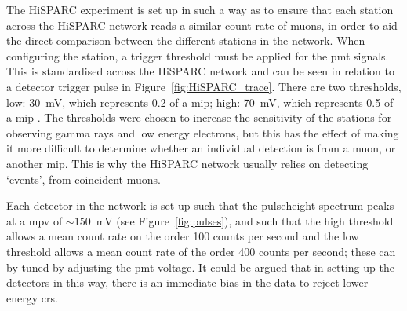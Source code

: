The HiSPARC experiment is set up in such a way as to ensure that each station across the HiSPARC network reads a similar count rate of muons, in order to aid the direct comparison between the different stations in the network. When configuring the station, a trigger threshold must be applied for the \gls{pmt} signals. This is standardised across the HiSPARC network and can be seen in relation to a detector trigger pulse in Figure~\ref{fig:HiSPARC_trace}. There are two thresholds, low: 30~mV, which represents 0.2 of a \gls{mip}; high: 70~mV, which represents 0.5 of a \gls{mip} \citep{fokkema_hisparc_2012, van_dam_hisparc_2020}. The thresholds were chosen to increase the sensitivity of the stations for observing gamma rays and low energy electrons, but this has the effect of making it more difficult to determine whether an individual detection is from a muon, or another \gls{mip}. This is why the HiSPARC network usually relies on detecting `events', from coincident muons.

Each detector in the network is set up such that the pulseheight spectrum peaks at a \gls{mpv} of $\sim 150$~mV (see Figure~\ref{fig:pulses}), and such that the high threshold allows a mean count rate on the order 100 counts per second and the low threshold allows a mean count rate of the order 400 counts per second; these can by tuned by adjusting the \gls{pmt} voltage. It could be argued that in setting up the detectors in this way, there is an immediate bias in the data to reject lower energy \glspl{cr}.

